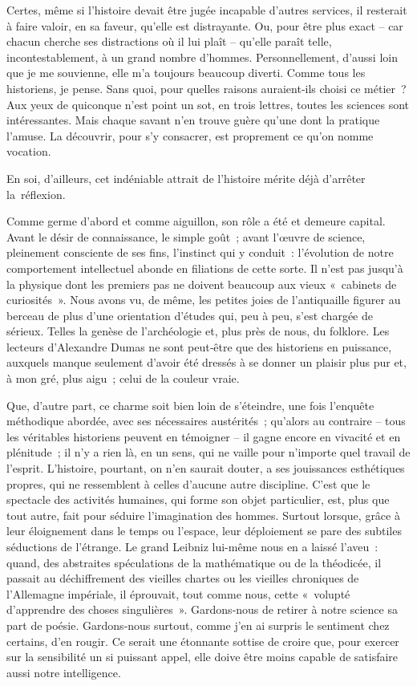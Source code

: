 \documentclass[french,twoside]{book} %
\begin{document}
\noindent Certes, même si l’histoire devait être jugée incapable d’autres services, il resterait à faire valoir, en sa faveur, qu’elle est distrayante. Ou, pour  
\label{pXI} être plus exact – car chacun cherche ses distractions où il lui plaît – qu’elle paraît telle, incontestablement, à un grand nombre d’hommes. Personnellement, d’aussi loin que je me souvienne, elle m’a toujours beau­coup diverti. Comme tous les historiens, je pense. Sans quoi, pour quelles raisons auraient‑ils choisi ce métier ? Aux yeux de quiconque n’est point un sot, en trois lettres, toutes les sciences sont intéressantes. Mais chaque savant n’en trouve guère qu’une dont la pratique l’amuse. La découvrir, pour s’y consacrer, est proprement ce qu’on nomme vocation.\par
En soi, d’ailleurs, cet indéniable attrait de l’histoire mérite déjà d’ar­rêter la réflexion.\par
Comme germe d’abord et comme aiguillon, son rôle a été et demeure capital. Avant le désir de connaissance, le simple goût ; avant l’œuvre de science, pleinement consciente de ses fins, l’instinct qui y conduit : l’évolution de notre comportement intellectuel abonde en filiations de cette sorte. Il n’est pas jusqu’à la physique dont les premiers pas ne doivent beaucoup aux vieux « cabinets de curiosités ». Nous avons vu, de même, les petites joies de l’antiquaille figurer au berceau de plus d’une orientation d’études qui, peu à peu, s’est chargée de sérieux. Telles la genèse de l’archéologie et, plus près de nous, du folklore. Les lecteurs d’Alexandre Dumas ne sont peut‑être que des historiens en puissance, auxquels manque seulement d’avoir été dressés à se donner un plaisir plus pur et, à mon gré, plus aigu ; celui de la couleur vraie.\par
Que, d’autre part, ce charme soit bien loin de s’éteindre, une fois l’en­quête méthodique abordée, avec ses nécessaires austérités ; qu’alors au contraire – tous les véritables historiens peuvent en témoigner – il gagne encore en vivacité et en plénitude ; il n’y a rien là, en un sens, qui ne vaille pour n’importe quel travail de l’esprit. L’histoire, pourtant, on n’en saurait douter, a ses jouissances esthétiques propres, qui ne ressemblent à celles d’aucune autre discipline. C’est que le spectacle des activités humaines, qui forme son objet particulier, est, plus que tout autre, fait pour séduire l’imagination des hommes. Surtout lorsque, grâce à leur éloignement dans le temps ou l’espace, leur déploiement se pare des subtiles séductions de l’étrange. Le grand Leibniz lui-même nous en a laissé l’aveu : quand, des abstraites spéculations de la mathématique ou de la théodicée, il passait au déchiffrement des vieilles chartes ou les vieilles chroniques de l’Allemagne impériale, il éprouvait, tout comme nous, cette « volupté d’apprendre des choses singulières ». Gardons‑nous de retirer à notre science sa part de poésie. Gardons‑nous surtout, comme j’en ai surpris le sentiment chez certains, d’en rougir. Ce serait une éton­nante sottise de croire que, pour exercer sur la sensibilité un si puissant appel, elle doive être moins capable de satisfaire aussi notre intelligence.\par
\end{document}
